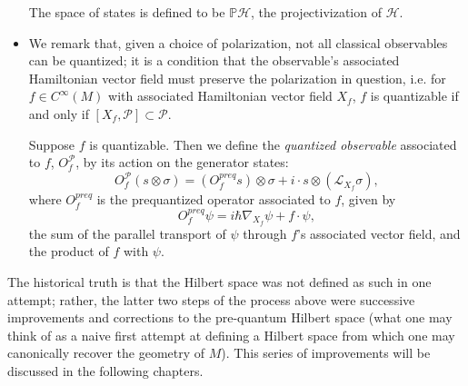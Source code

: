 \begin{defn}
\begin{itemize}
The space of states is defined to be $\mathbb{P}\mathcal{H}$, the projectivization of $\mathcal{H}$.

\item We remark that, given a choice of polarization, not all classical observables can be quantized; it is a condition that the observable's associated Hamiltonian vector field must preserve the polarization in question, i.e. for $f \in C^\infty(M)$ with associated Hamiltonian vector field $X_f$, $f$ is quantizable if and only if $[X_f,\mathcal{P}] \subset \mathcal{P}$.

Suppose $f$ is quantizable. Then we define the \emph{quantized observable} associated to $f$, $O^\mathcal{P}_f$, by its action on the generator states:
$$
O^\mathcal{P}_f(s \otimes \sigma) = (O^{preq}_f s) \otimes \sigma + i \cdot s \otimes (\mathcal{L}_{X_f}\sigma),
$$
where $O^{preq}_f$ is the prequantized operator associated to $f$, given by
$$
O^{preq}_f \psi = i\hbar\nabla_{X_f}\psi + f\cdot\psi,
$$
the sum of the parallel transport of $\psi$ through $f$'s associated vector field, and the product of $f$ with $\psi$.
\end{itemize}
\end{defn}

The historical truth is that the Hilbert space was not defined as such in one attempt; rather, the latter two steps of the process above were successive improvements and corrections to the pre-quantum Hilbert space (what one may think of as a naive first attempt at defining a Hilbert space from which one may canonically recover the geometry of $M$). This series of improvements will be discussed in the following chapters.

